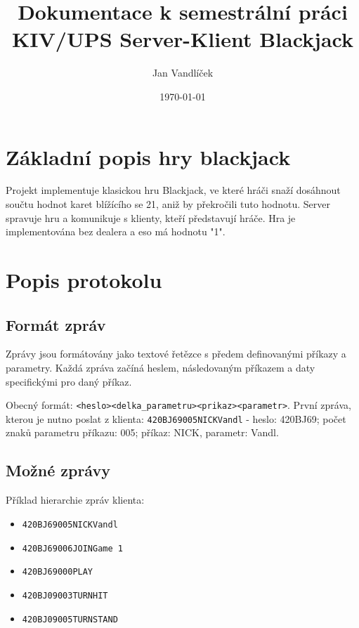\documentclass{article}
\title{Dokumentace k semestrální práci KIV/UPS Server-Klient Blackjack}
\author{Jan Vandlíček}
\date{\today}
\begin{document}
\maketitle

\section{Základní popis hry blackjack}
Projekt implementuje klasickou hru Blackjack, ve které hráči snaží dosáhnout součtu hodnot karet blížícího se 21, aniž by překročili tuto hodnotu. Server spravuje hru a komunikuje s klienty, kteří představují hráče. Hra je implementována bez dealera a eso má hodnotu "1".

\section{Popis protokolu}
\subsection{Formát zpráv}
Zprávy jsou formátovány jako textové řetězce s předem definovanými příkazy a parametry. Každá zpráva začíná heslem, následovaným příkazem a daty specifickými pro daný příkaz.

Obecný formát: \texttt{<heslo><delka\_parametru><prikaz><parametr>}. První zpráva, kterou je nutno poslat z klienta: \texttt{420BJ69005NICKVandl} - heslo: 420BJ69; počet znaků parametru příkazu: 005; příkaz: NICK, parametr: Vandl.

\subsection{Možné zprávy}

Příklad hierarchie zpráv klienta:
\begin{itemize}
    \item \texttt{420BJ69005NICKVandl}
    \item \texttt{420BJ69006JOINGame 1}
    \item \texttt{420BJ69000PLAY}
    \item \texttt{420BJ09003TURNHIT}
    \item \texttt{420BJ09005TURNSTAND}
\end{itemize}
\end{document}

